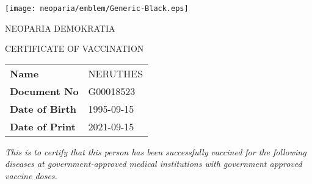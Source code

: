 \documentclass[b6paper,10pt]{article}
\begin{document}
        \begin{minipage}[b][110mm][t]{77mm}
            \large
            \RaggedRight

            {\hfill{\texttt{[image: neoparia/emblem/Generic-Black.eps]}}\hfill}
            
            {\hfill{NEOPARIA DEMOKRATIA}\hfill}


            {\hfill{CERTIFICATE OF VACCINATION}\hfill}

            \vspace{3mm}

            \ttfamily
            \newcommand{\bearerinfotablerow}[2]{
                {\sffamily\bfseries\small{#1}} & {\hspace{12pt}\ttfamily\normalsize\color{Sepia}#2} \\
            }
            \tabcolsep=0pt
            \begin{tabu} {lX}
                \bearerinfotablerow{Name}{NERUTHES}
                \bearerinfotablerow{Document No}{G00018523}
                \bearerinfotablerow{Date of Birth}{1995-09-15}
                \bearerinfotablerow{Date of Print}{2021-09-15}
            \end{tabu}

            \vspace{3mm}

            {\rmfamily\itshape\small
                This is to certify that this person has been successfully vaccined for the following diseases
                at government-approved medical institutions with government approved vaccine doses.\\

            }

            \vspace{6mm}



\end{minipage}
\end{document}
